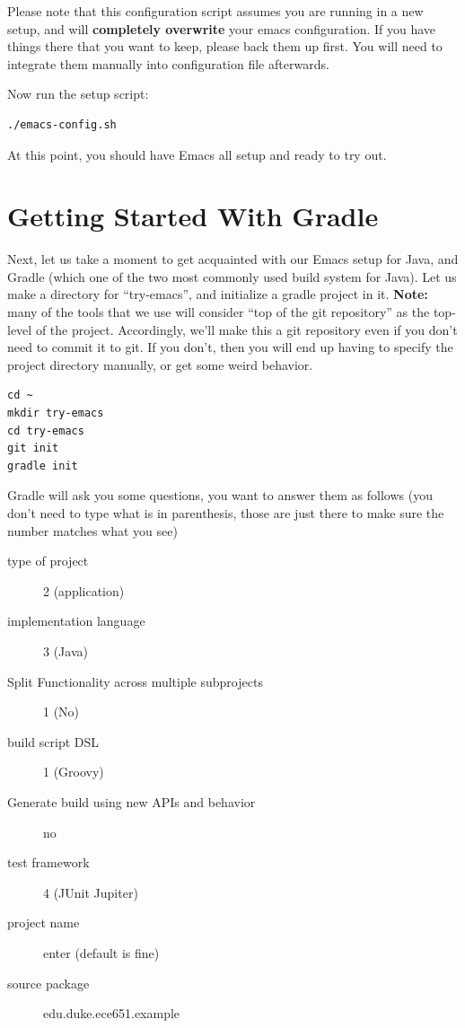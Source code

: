 \documentclass[12pt]{article}
\begin{document}
Please note that this configuration script assumes you are running in a new
setup, and will \textbf{completely overwrite} your emacs configuration.  If you have
things there that you want to keep, please back them up first.  You
will need to integrate them manually into configuration file
afterwards.

Now run the setup script:
\begin{verbatim}
./emacs-config.sh
\end{verbatim}

At this point, you should have Emacs all setup and ready to try out.


\section{Getting Started With Gradle}

Next, let us take a moment to get acquainted with our Emacs setup for
Java, and Gradle (which one of the two most commonly used build system
for Java).  Let us make a directory for ``try-emacs'', and initialize
a gradle project in it.  \textbf{Note:} many of the tools that we use will consider ``top of the
git repository'' as the top-level of the project.  Accordingly,
we'll make this a git repository even if you don't need to commit
it to git.  If you don't, then you will end up having to specify
the project directory manually, or get some weird behavior.


\begin{verbatim}
cd ~
mkdir try-emacs
cd try-emacs
git init
gradle init
\end{verbatim}


Gradle will ask you some questions, you want to answer them
as follows (you don't need to type what is in parenthesis, those are
just there to make sure the number matches what you see)
\begin{description}
\item [type of project] 2 (application)
\item [implementation language] 3 (Java)
\item [Split Functionality across multiple subprojects] 1 (No)
\item [build script DSL] 1 (Groovy)
\item [Generate build using new APIs and behavior] no
\item [test framework] 4  (JUnit Jupiter) 
\item [project name] enter (default is fine)
\item [source package] edu.duke.ece651.example
\end{description}
\end{document}
